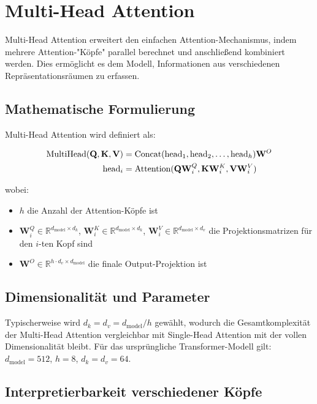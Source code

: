 \section{Multi-Head Attention}

Multi-Head Attention erweitert den einfachen Attention-Mechanismus, indem mehrere Attention-"Köpfe" parallel berechnet und anschließend kombiniert werden. Dies ermöglicht es dem Modell, Informationen aus verschiedenen Repräsentationsräumen zu erfassen.

\subsection{Mathematische Formulierung}

Multi-Head Attention wird definiert als:

\begin{align}
\text{MultiHead}(\mathbf{Q}, \mathbf{K}, \mathbf{V}) &= \text{Concat}(\text{head}_1, \text{head}_2, \ldots, \text{head}_h)\mathbf{W}^O \\
\text{head}_i &= \text{Attention}(\mathbf{Q}\mathbf{W}_i^Q, \mathbf{K}\mathbf{W}_i^K, \mathbf{V}\mathbf{W}_i^V)
\end{align}

wobei:
\begin{itemize}
    \item $h$ die Anzahl der Attention-Köpfe ist
    \item $\mathbf{W}_i^Q \in \mathbb{R}^{d_{\text{model}} \times d_k}$, $\mathbf{W}_i^K \in \mathbb{R}^{d_{\text{model}} \times d_k}$, $\mathbf{W}_i^V \in \mathbb{R}^{d_{\text{model}} \times d_v}$ die Projektionsmatrizen für den $i$-ten Kopf sind
    \item $\mathbf{W}^O \in \mathbb{R}^{h \cdot d_v \times d_{\text{model}}}$ die finale Output-Projektion ist
\end{itemize}

\subsection{Dimensionalität und Parameter}

Typischerweise wird $d_k = d_v = d_{\text{model}}/h$ gewählt, wodurch die Gesamtkomplexität der Multi-Head Attention vergleichbar mit Single-Head Attention mit der vollen Dimensionalität bleibt. Für das ursprüngliche Transformer-Modell gilt: $d_{\text{model}} = 512$, $h = 8$, $d_k = d_v = 64$.

\subsection{Interpretierbarkeit verschiedener Köpfe}

